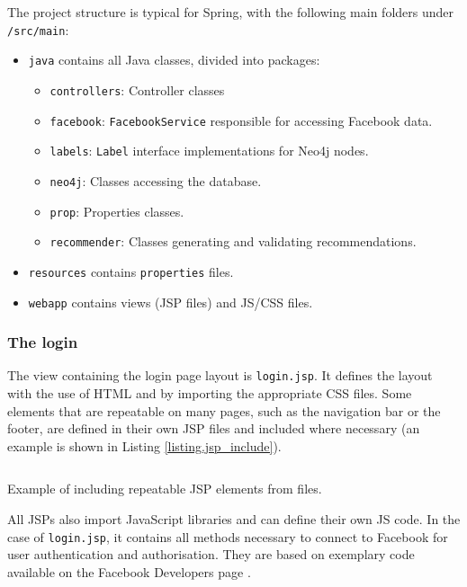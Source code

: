 \documentclass[12pt]{report}
\begin{document}
The project structure is typical for Spring, with the following main folders under \texttt{/src/main}:
\begin{itemize}
\item \texttt{java} contains all Java classes, divided into packages:
    \begin{itemize}
    \item \texttt{controllers}: Controller classes
    \item \texttt{facebook}: \texttt{FacebookService} responsible for accessing Facebook data.
    \item \texttt{labels}: \texttt{Label} interface implementations for Neo4j nodes.
    \item \texttt{neo4j}: Classes accessing the database.
    \item \texttt{prop}: Properties classes.
    \item \texttt{recommender}: Classes generating and validating recommendations.
    \end{itemize}
\item \texttt{resources} contains \texttt{properties} files.
\item \texttt{webapp} contains views (JSP files) and JS/CSS files.
\end{itemize}


\subsubsection{The login}

The view containing the login page layout is \texttt{login.jsp}. It defines the layout with the use of HTML and by importing the appropriate CSS files. Some elements that are repeatable on many pages, such as the navigation bar or the footer, are defined in their own JSP files and included where necessary (an example is shown in Listing \ref{listing.jsp_include}).

\begin{listing}
\inputminted[framesep=3mm,fontsize=\footnotesize,bgcolor=gray!20]{jsp}{code_jsp_include.jsp}
\caption{Example of including repeatable JSP elements from files.}
\label{listing.jsp_include}
\end{listing}

All JSPs also import JavaScript libraries and can define their own JS code. In the case of \texttt{login.jsp}, it contains all methods necessary to connect to Facebook for user authentication and authorisation. They are based on exemplary code available on the Facebook Developers page \cite{facebook_login_web}.
\end{document}
